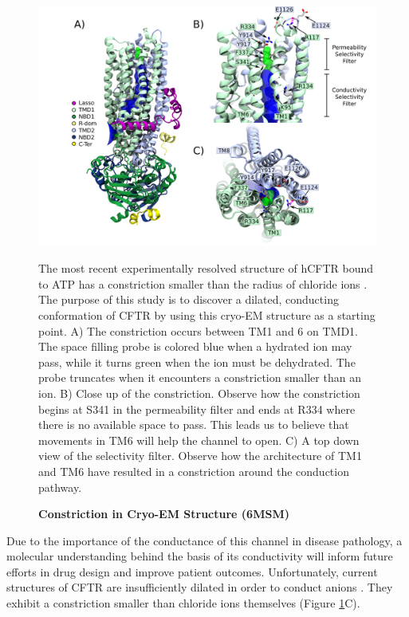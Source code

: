 \begin{figure}
	\begin{center}
		\includegraphics[width=1\textwidth]{figures/opening/overall_hole_constricted.pdf}
	\end{center}
	\captionsetup{singlelinecheck = false, justification=raggedright}
	\caption[Constriction in Cryo-EM Structure (6MSM)] {\textbf{Constriction in Cryo-EM Structure (6MSM)}}{The most recent experimentally resolved structure of hCFTR bound to ATP has a constriction smaller than the radius of chloride ions \cite{zhang2018}. The purpose of this study is to discover a dilated, conducting conformation of CFTR by using this cryo-EM structure as a starting point. A) The constriction occurs between TM1 and 6 on TMD1. The space filling probe is colored blue when a hydrated ion may pass, while it turns green when the ion must be dehydrated. The probe truncates when it encounters a constriction smaller than an ion.  B) Close up of the constriction. Observe how the constriction begins at S341 in the permeability filter and ends at R334 where there is no available space to pass. This leads us to believe that movements in TM6 will help the channel to open. C) A top down view of the selectivity filter. Observe how the architecture of TM1 and TM6 have resulted in a constriction around the conduction pathway.}
	\label{constricted_sel_filter}
\end{figure}

Due to the importance of the conductance of this channel in disease pathology, a molecular understanding behind the basis of its conductivity will inform future efforts in drug design and improve patient outcomes. Unfortunately, current structures of CFTR are insufficiently dilated in order to conduct anions \cite{zhang2018, liu2019, fiedorczuk2022}. They exhibit a constriction smaller than chloride ions themselves (Figure \ref{constricted_sel_filter}C).

